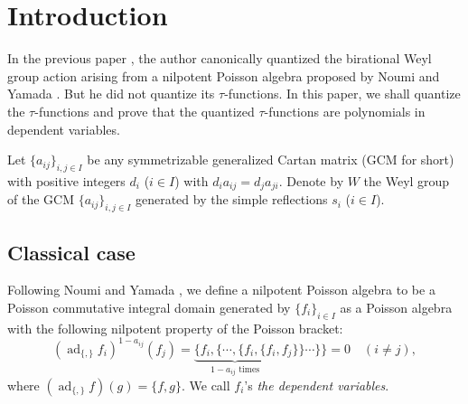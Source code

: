 \documentclass[12pt,twoside]{article}
\newcommand\ad{\mathop{\mathrm{ad}}\nolimits}
\theoremstyle{plain} %
\theoremstyle{definition} %
\theoremstyle{definition} %
\numberwithin{theorem}{section}
\numberwithin{equation}{section}
\numberwithin{figure}{section}
\numberwithin{table}{section}
\begin{document}
\title{\TITLE}
\author{\AUTHOR}
\date{\DATE}
\maketitle
\begin{abstract}
  \ABSTRACT
\end{abstract}
\tableofcontents
\setcounter{section}{-1} %

\section{Introduction}


In the previous paper \cite{Kuroki2008}, the author canonically quantized 
the birational Weyl group action arising from a nilpotent
Poisson algebra proposed by Noumi and Yamada \cite{NY0012028}.
But he did not quantize its $\tau$-functions.
In this paper, we shall quantize the $\tau$-functions and
prove that the quantized $\tau$-functions are polynomials in dependent variables.

Let $\{a_{ij}\}_{i,j\in I}$ be any symmetrizable generalized Cartan matrix
(GCM for short) with positive integers $d_i$ ($i\in I$) with $d_i a_{ij}=d_j a_{ji}$.
Denote by $W$ the Weyl group of the GCM $\{a_{ij}\}_{i,j\in I}$
generated by the simple reflections $s_i$ ($i\in I$).


\subsection{Classical case}

Following Noumi and Yamada \cite{NY0012028}, we define a nilpotent Poisson algebra 
to be a Poisson commutative integral domain generated by $\{f_i\}_{i\in I}$ 
as a Poisson algebra with the following nilpotent property of the Poisson bracket:
\begin{equation*}
 (\ad_{\{,\}} f_i)^{1-a_{ij}}(f_j)
 = \underbrace{\{f_i,\{\cdots,\{f_i,\{f_i}_{\text{$1-a_{ij}$ times}},f_j\}\}\cdots\}\}
 = 0
 \quad (i\ne j),
\end{equation*}
where $(\ad_{\{,\}} f)(g)=\{f,g\}$.
We call $f_i$'s {\em the dependent variables}.
\end{document}
